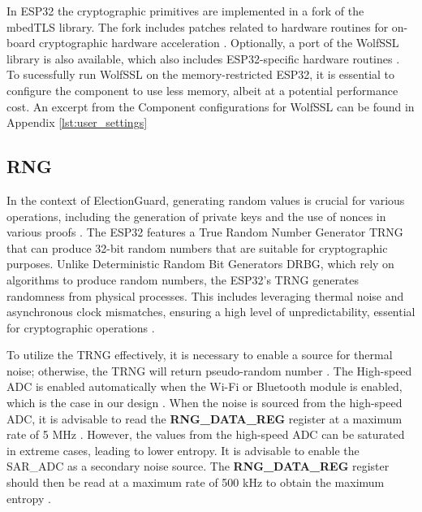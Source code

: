 In ESP32 the cryptographic primitives are implemented in a fork of the mbedTLS library. The fork includes patches related to hardware routines for on-board cryptographic hardware acceleration \cite{esp32-ref}. Optionally, a port of the WolfSSL library is also available, which also includes ESP32-specific hardware routines \cite[114]{wolfSSL-manual}. To sucessfully run WolfSSL on the memory-restricted ESP32, it is essential to configure the component to use less memory, albeit at a potential performance cost. An excerpt from the Component configurations for WolfSSL can be found in Appendix \ref{lst:user_settings}

\subsection{\ac{RNG}}
In the context of ElectionGuard, generating random values is crucial for various operations, including the generation of private keys and the use of nonces in various proofs \cite[9, 13]{eg-spec}. The ESP32 features a True Random Number Generator \ac{TRNG} that can produce 32-bit random numbers that are suitable for cryptographic purposes. Unlike Deterministic Random Bit Generators \ac{DRBG}, which rely on algorithms to produce random numbers, the ESP32's \ac{TRNG} generates randomness from physical processes. This includes leveraging thermal noise and asynchronous clock mismatches, ensuring a high level of unpredictability, essential for cryptographic operations \cite[604]{esp32-ref}.

To utilize the \ac{TRNG} effectively, it is necessary to enable a source for thermal noise; otherwise, the \ac{TRNG} will return pseudo-random number \cite[609]{esp32-ref}. The High-speed ADC is enabled automatically when the Wi-Fi or Bluetooth module is enabled, which is the case in our design \cite[610]{esp32-ref}. When the noise is sourced from the high-speed ADC, it is advisable to read the \textbf{RNG\_DATA\_REG} register at a maximum rate of 5 MHz \cite[609]{esp32-ref}. However, the values from the high-speed ADC can be saturated in extreme cases, leading to lower entropy. It is advisable to enable the SAR\_ADC as a secondary noise source. The \textbf{RNG\_DATA\_REG} register should then be read at a maximum rate of 500 kHz to obtain the maximum entropy \cite[609]{esp32-ref}.


